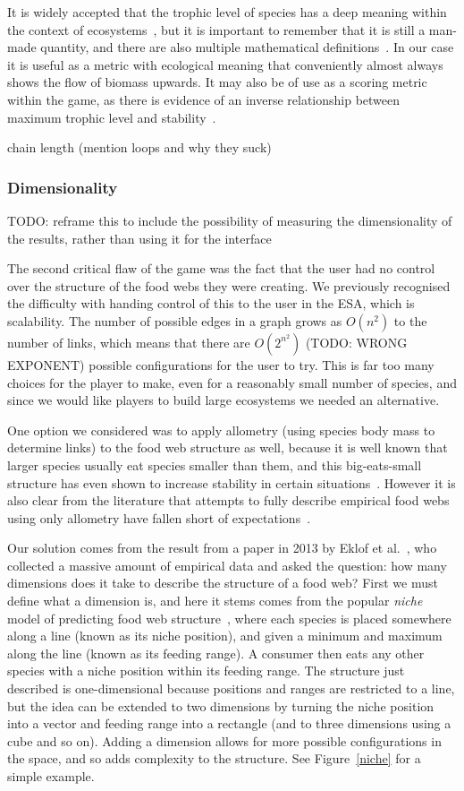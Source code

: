 It is widely accepted that the trophic level of species has a deep meaning within the context of ecosystems~\cite{post}, but it is important to remember that it is still a man-made quantity, and there are also multiple mathematical definitions~\cite{trophic}.
In our case it is useful as a metric with ecological meaning that conveniently almost always shows the flow of biomass upwards.
It may also be of use as a scoring metric within the game, as there is evidence of an inverse relationship between maximum trophic level and stability~\cite{emmerson, post}.

chain length
(mention loops and why they suck)

\subsubsection{Dimensionality}
TODO: reframe this to include the possibility of measuring the dimensionality of the results, rather than using it for the interface

The second critical flaw of the game was the fact that the user had no control over the structure of the food webs they were creating.
We previously recognised the difficulty with handing control of this to the user in the ESA, which is scalability. The number of possible edges in a graph grows as $O(n^2)$ to the number of links, which means that there are $O(2^{n^2})$ (TODO: WRONG EXPONENT) possible configurations for the user to try.
This is far too many choices for the player to make, even for a reasonably small number of species, and since we would like players to build large ecosystems we needed an alternative.

One option we considered was to apply allometry (using species body mass to determine links) to the food web structure as well, because
it is well known that larger species usually eat species smaller than them, and this big-eats-small structure has even shown to increase stability in certain situations~\cite{brose}.
However it is also clear from the literature that attempts to fully describe empirical food webs using only allometry have fallen short of expectations~\cite{stuff, stuff2, stuff3}.

Our solution comes from the result from a paper in 2013 by Eklof et al.~\cite{eklof}, who collected a massive amount of empirical data and asked the question: how many dimensions does it take to describe the structure of a food web? First we must define what a dimension is, and here it stems comes from the popular \emph{niche} model of predicting food web structure~\cite{niche}, where each species is placed somewhere along a line (known as its niche position), and given a minimum and maximum along the line (known as its feeding range). A consumer then eats any other species with a niche position within its feeding range.
The structure just described is one-dimensional because positions and ranges are restricted to a line, but the idea can be extended to two dimensions by turning the niche position into a vector and feeding range into a rectangle (and to three dimensions using a cube and so on).
Adding a dimension allows for more possible configurations in the space, and so adds complexity to the structure.
See Figure~\ref{niche} for a simple example.

